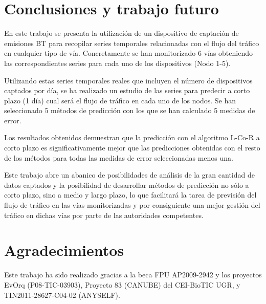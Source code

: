 \documentclass[runningheads]{llncs}
\begin{document}

\section{Conclusiones y trabajo futuro}
\label{sec:conclusions}

En este trabajo se presenta la utilización de un dispositivo de captación de emisiones BT para
recopilar series temporales relacionadas con el flujo del tráfico en cualquier tipo de vía.
Concretamente se han monitorizado 6 vías obteniendo las correspondientes series para cada uno de
los  dispositivos (Nodo 1-5). 

Utilizando estas series temporales reales que incluyen el número de dispositivos captados por día,
se ha realizado un estudio de las series para predecir a corto plazo (1 día) cual será el flujo de
tráfico en cada uno de los nodos. Se han seleccionado 5 métodos de predicción con los que se han
calculado 5 medidas de error. 

Los resultados obtenidos demuestran que la predicción con el algoritmo L-Co-R a corto plazo es
significativamente mejor que las predicciones obtenidas con el resto de los métodos para todas las
medidas de error seleccionadas menos una. 

Este trabajo abre un abanico de posibilidades de análisis de la gran cantidad de datos captados y
la posibilidad de desarrollar métodos de predicción no sólo a corto plazo, sino a medio y largo
plazo, lo que facilitará la tarea de previsión del flujo de tráfico en las vías monitorizadas y por
consiguiente una mejor gestión del tráfico en dichas vías por parte de las autoridades competentes.

\section{Agradecimientos}
Este trabajo ha sido realizado gracias a la beca FPU AP2009-2942 y los proyectos EvOrq (P08-TIC-03903), Proyecto 83 (CANUBE) del CEI-BioTIC UGR, y TIN2011-28627-C04-02 (ANYSELF).


\end{document}
